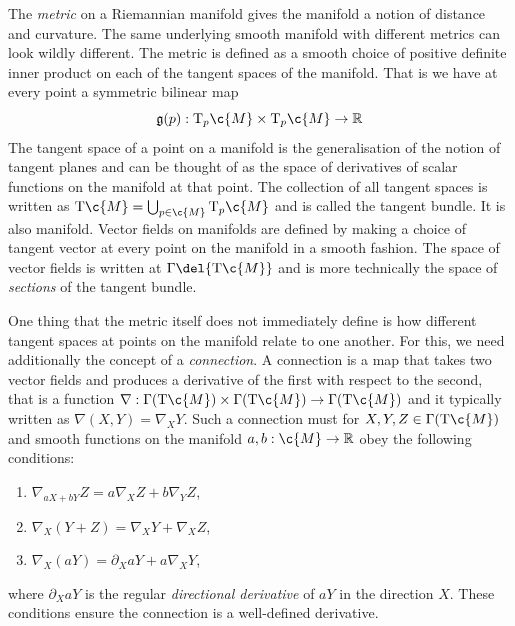 The \emph{metric} on a Riemannian manifold gives the manifold a notion of distance and curvature.
The same underlying smooth manifold with different metrics can look wildly different.
The metric is defined as a smooth choice of positive definite inner product on each of the tangent spaces of the manifold.
That is we have at every point a symmetric bilinear map \[\mathfrak{g}(p): \mathrm{T}_p\c{M} \times \mathrm{T}_p\c{M} \to \R\] The tangent space of a point on a manifold is the generalisation of the notion of tangent planes and can be thought of as the space of derivatives of scalar functions on the manifold at that point.
The collection of all tangent spaces is written as \(\mathrm{T}\c{M} = \bigcup_{p\in \c{M}} \mathrm{T}_p \c{M}\) and is called the tangent bundle.
It is also manifold.
Vector fields on manifolds are defined by making a choice of tangent vector at every point on the manifold in a smooth fashion.
The space of vector fields is written at \(\Gamma\del{\mathrm{T}\c{M}}\) and is more technically the space of \emph{sections} of the tangent bundle.

One thing that the metric itself does not immediately define is how different tangent spaces at points on the manifold relate to one another.
For this, we need additionally the concept of a \emph{connection}.
A connection is a map that takes two vector fields and produces a derivative of the first with respect to the second, that is a function \(\nabla: \Gamma(\mathrm{T}\c{M}) \times \Gamma(\mathrm{T}\c{M}) \to \Gamma(\mathrm{T}\c{M})\) and it typically written as \(\nabla(X, Y) = \nabla_X Y\).
Such a connection must for \(X, Y,Z\in\Gamma(\mathrm{T}\c{M})\) and smooth functions on the manifold \(a,b: \c{M}\to\R\) obey the following conditions: \begin{enumerate}[label=(\alph*)] \item \(\nabla_{aX + bY}Z = a\nabla_X Z + b\nabla_Y Z\), \item \(\nabla_X(Y+Z) = \nabla_X Y + \nabla_X Z\), \item \(\nabla_X(aY) = \partial_X aY + a \nabla_X Y\), \end{enumerate} where \( \partial_X aY \) is the regular \emph{directional derivative} of \(aY\) in the direction \(X\).
These conditions ensure the connection is a well-defined derivative.

